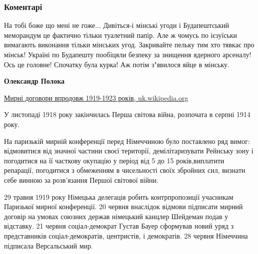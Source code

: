  
 
 
 
 
\subsubsection{Коментарі}

\begin{itemize} %

На тобі боже що мені не гоже... Дивіться-і мінські угоди і Будапештський
меморандум це фактично тільки туалетний папір. Але ж чомусь по ієзуїськи
вимагають виконання тільки мінських угод. Закривайте пельку тим хто тявкає про
мінськ! Україні по Будапешту пообіцяли безпеку за знищення ядерного арсеналу! Ось
це головне! Спочатку була курка! Аж потім з"явилося яйце в мінську.

\begin{itemize} %
\textbf{Олександр Полока}

\href{https://uk.wikipedia.org/wiki/Мирні_договори_впродовж_1919-1923_років}{%
Мирні договори впродовж 1919-1923 років, uk.wikipedia.org%
}

\begin{multicols}{2}

У листопаді 1918 року закінчилась Перша світова війна, розпочата в серпні 1914
року.

На паризькій мирній конференції перед Німеччиною було поставлено ряд вимог:
відмовитися від значної частини своєї території, демілітаризувати Рейнську зону
і погодитися на її часткову окупацію у період від 5 до 15 років,виплатити
репарації, погодитися з обмеженням в чисельності своїх збройних сил, визнати
себе винною за розв'язання Першої світової війни.

29 травня 1919 року Німецька делегація робить контрпропозиції учасникам
Паризької мирної конференції. 20 червня внаслідок відмови підписати мирний
договір на умовах союзних держав німецький канцлер Шейдеман подав у відставку.
21 червня соціал-демократ Густав Бауер сформував новий уряд з представників
соціал-демократів, центристів, і демократів. 28 червня Німеччина підписала
Версальський мир.


\end{multicols}
\end{itemize}
\end{itemize}

